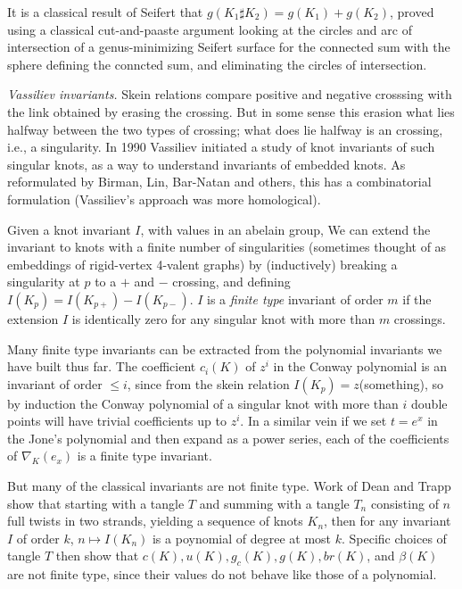 It is a classical result of Seifert that $g(K_1\sharp K_2)=g(K_1)+g(K_2)$, proved
using a classical cut-and-paaste argument looking at the circles and arc of
intersection of a genus-minimizing Seifert surface for the connected sum 
with the sphere defining the conncted sum, and eliminating the circles of 
intersection. 

\msk

{\it Vassiliev invariants.} Skein relations compare positive and negative
crosssing with the link obtained by erasing the crossing. But in some sense
this erasion  what lies halfway between the two types of crossing; 
what does lie halfway is an  crossing, i.e., a singularity. 
In 1990 Vassiliev initiated a study of knot invariants of such singular knots,
as a way to understand invariants of embedded knots. As reformulated by
Birman, Lin, Bar-Natan and others, this has a combinatorial formulation
(Vassiliev's approach was more homological). 

\ssk

Given a knot invariant $I$, with values in an abelain group, We can extend the
invariant to knots with a finite number of singularities (sometimes thought of
as embeddings of rigid-vertex 4-valent graphs) by (inductively) breaking
a singularity at $p$ to a $+$ and $-$ crossing, and defining
$I(K_p)=I(K_{p+})-I(K_{p-})$. $I$ is a {\it finite type} invariant of order $m$
if the extension $I$ is identically zero for any singular knot with more 
than $m$ crossings. 

\ssk

Many finite type invariants can be extracted from the polynomial invariants we
have built thus far. The coefficient $c_i(K)$ of $z^i$ in the Conway polynomial
is an invariant of order $\leq i$, since from the skein relation 
$I(K_p)=z$(something), so by induction the Conway polynomial of a singular 
knot with more than $i$ double points will have trivial coefficients up to
$z^i$. In a similar vein if we set $t=e^x$ in the Jone's polynomial and then 
expand as a power series, each of the coefficients of $\nabla_K(e_x)$ is 
a finite type invariant.

\msk

But many of the classical invariants are not finite type. Work of Dean and Trapp
show that starting with a tangle $T$ and summing with a tangle $T_n$ consisting
of $n$ full twists in two strands, yielding a sequence of knots $K_n$, then
for any invariant $I$ of order $k$, $n\mapsto I(K_n)$ is a poynomial of degree
at most $k$. Specific choices of tangle $T$ then show that $c(K),u(K),g_c(K),g(K),br(K)$,
and $\beta(K)$ are not finite type, since their values do not behave like those
of a polynomial.

